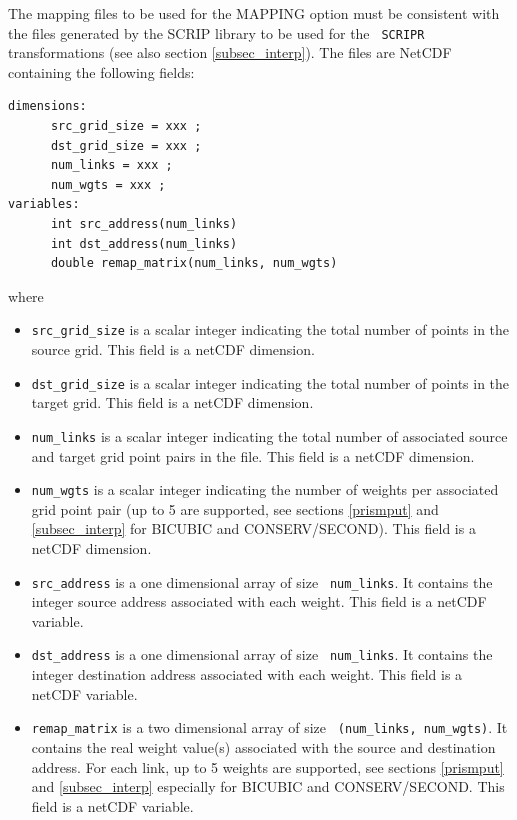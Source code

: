 The mapping files to be used for the MAPPING option must be consistent
with the files generated by the SCRIP library to be used for the {\tt
  SCRIPR} transformations (see also section \ref{subsec_interp}). The
files are NetCDF containing the following fields:
\begin{verbatim}
dimensions:
      src_grid_size = xxx ;
      dst_grid_size = xxx ;
      num_links = xxx ;
      num_wgts = xxx ;
variables:
      int src_address(num_links) 
      int dst_address(num_links) 
      double remap_matrix(num_links, num_wgts) 
\end{verbatim}
where
\begin{itemize}
\item {\tt src\_grid\_size} is a scalar integer indicating the total number
  of points in the source grid.  
  This field is a netCDF dimension.
\item {\tt dst\_grid\_size} is a scalar integer indicating the total number
  of points in the target grid.  
  This field is a netCDF dimension.
\item {\tt num\_links} is a scalar integer indicating the total number
  of associated source and target grid point pairs in the file.  This field is a netCDF dimension.
\item {\tt num\_wgts} is a scalar integer indicating the number of
  weights per associated grid point pair (up to 5 are supported, see
  sections \ref{prismput} and \ref{subsec_interp} for BICUBIC and CONSERV/SECOND).
  This field is a netCDF dimension.
\item {\tt src\_address} is a one dimensional array of size {\tt
    num\_links}.  It contains the integer source address associated
  with each weight.  This field is a netCDF variable.
\item {\tt dst\_address} is a one dimensional array of size {\tt
    num\_links}.  It contains the integer destination address
  associated with each weight.  This field is a netCDF variable.
\item {\tt remap\_matrix} is a two dimensional array of size {\tt
    (num\_links, num\_wgts)}.  It contains the real weight value(s)
  associated with the source and destination address.  For each link, 
  up to 5 weights are supported, see sections \ref{prismput} and \ref{subsec_interp} 
  especially for BICUBIC and CONSERV/SECOND. This field is a
  netCDF variable.
\end{itemize}
